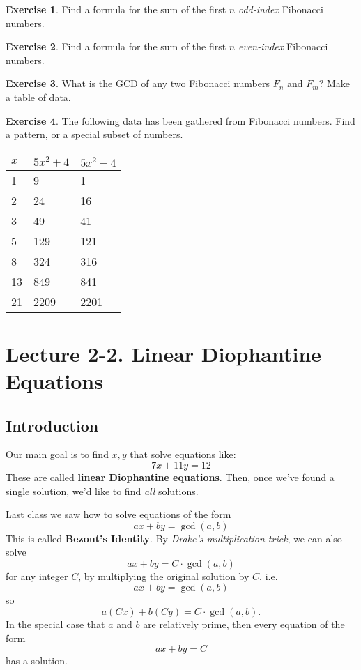 \documentclass[11pt]{article}
\theoremstyle{definition}
\newtheorem{exercise}{Exercise}
\numberwithin{thm}{section}
\begin{document}
\begin{exercise} Find a formula for the sum of the first $n$ \textit{odd-index} Fibonacci numbers.
\end{exercise}

\begin{exercise} Find a formula for the sum of the first $n$ \textit{even-index} Fibonacci numbers.
\end{exercise}

\begin{exercise} What is the GCD of any two Fibonacci numbers $F_n$ and $F_m$? Make a table of data.
\end{exercise}

\begin{exercise} The following data has been gathered from Fibonacci numbers. Find a pattern, or a special subset of numbers.

\begin{table}[ht!]
\begin{tabular}{l|l|l}
$x$ & $5x^2+4$ & $5x^2 - 4$ \\ \hline
1 & 9 & 1 \\
2 & 24 & 16 \\
3 & 49 & 41 \\
5 & 129 & 121 \\
8 & 324 & 316 \\
13 & 849 & 841 \\
21 & 2209 & 2201
\end{tabular}
\end{table}
\end{exercise}


\newpage
\section{Lecture 2-2. Linear Diophantine Equations}

\subsection{Introduction}

Our main goal is to find $x,y$ that solve equations like:
\[
	7x + 11y = 12 
\]
These are called \textbf{linear Diophantine equations}. Then, once we've found a single solution, we'd like to find \textit{all} solutions.

Last class we saw how to solve equations of the form
\[
	ax + by = \gcd(a,b)
\]
This is called \textbf{Bezout's Identity}. By \textit{Drake's multiplication trick}, we can also solve
\[
	ax + by = C \cdot \gcd(a,b)
\]
for any integer $C$, by multiplying the original solution by $C$. i.e.
\[
	ax + by = \gcd(a,b)
\]
so
\[
	a(Cx) + b(Cy) = C \cdot \gcd(a,b).
\]
In the special case that $a$ and $b$ are relatively prime, then every equation of the form
\[
	ax + by = C
\]
has a solution.
\end{document}
